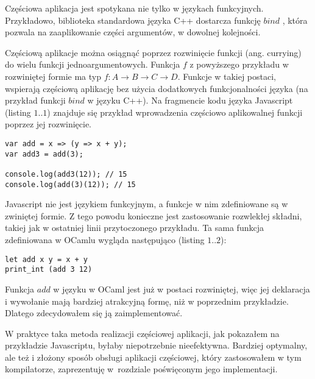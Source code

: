 \documentclass[declaration,shortabstract]{iithesis}
\begin{document}
Częściowa aplikacja jest spotykana nie tylko w językach funkcyjnych. 
Przykładowo, biblioteka standardowa języka C++ dostarcza funkcję
$bind$ \cite{cpp_bind}, która pozwala na zaaplikowanie części argumentów,
w dowolnej kolejności. 

Częściową aplikacje można osiągnąć poprzez rozwinięcie funkcji (ang. currying) 
do wielu funkcji jednoargumentowych. Funkcja $f$ z powyższego przykładu 
w rozwiniętej
formie ma typ $f : A \rightarrow B \rightarrow C \rightarrow D$. Funkcje w 
takiej postaci, wspierają częściową aplikację bez użycia dodatkowych 
funkcjonalności języka (na przykład funkcji $bind$ w języku C++).
Na fragmencie kodu języka 
Javascript (listing $1..1$) 
znajduje się przykład wprowadzenia częściowo aplikowalnej funkcji 
poprzez jej rozwinięcie.


\begin{lstlisting}[frame=single, caption=Rozwinięcie funkcji w Javascriptcie.]
var add = x => (y => x + y);
var add3 = add(3);

console.log(add3(12)); // 15
console.log(add(3)(12)); // 15
\end{lstlisting}

Javascript nie jest językiem funkcyjnym, a funkcje w nim zdefiniowane są w 
zwiniętej formie. Z tego powodu konieczne jest zastosowanie rozwlekłej składni,
takiej jak w ostatniej linii przytoczonego przykładu. Ta sama funkcja 
zdefiniowana w OCamlu wygląda następująco (listing $1..2$):

\begin{lstlisting}[frame=single, caption=Rozwinięta funkcja w OCamlu.]
let add x y = x + y 
print_int (add 3 12)
\end{lstlisting}

Funkcja $add$ w języku w OCaml jest już w postaci rozwiniętej, więc jej 
deklaracja i wywołanie mają bardziej atrakcyjną formę, niż w poprzednim 
przykładzie. Dlatego zdecydowałem się ją zaimplementować.

W praktyce taka metoda realizacji częściowej aplikacji, jak pokazałem na 
przykładzie Javascriptu, byłaby niepotrzebnie nieefektywna. Bardziej optymalny,
ale też i złożony sposób obsługi aplikacji częściowej, który zastosowałem w tym 
kompilatorze, zaprezentuję w~rozdziale poświęconym jego implementacji.

\end{document}
